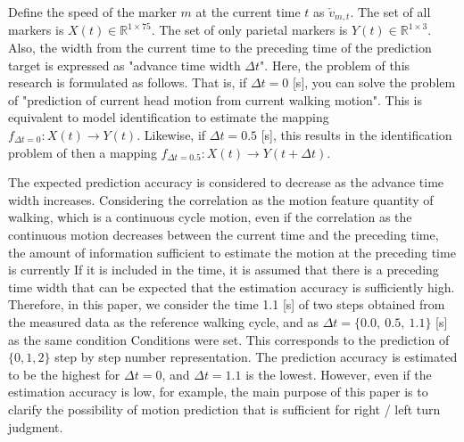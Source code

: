 \documentclass{sigchi}
\begin{document}
Define the speed of the marker $m$ at the current time $t$ as $\check{v}_{m, t}$. The set of all markers is $X(t)\in\mathbb{R}^{1 \times 75} $. The set of only parietal markers is $ Y(t)\in\mathbb {R}^{1\times 3}$. Also, the width from the current time to the preceding time of the prediction target is expressed as "advance time width $\Delta t$". Here, the problem of this research is formulated as follows. That is, if $\Delta t = 0$ [s], you can solve the problem of "prediction of current head motion from current walking motion". This is equivalent to model identification to estimate the mapping $ f_ {\Delta t = 0}: X (t) \rightarrow Y (t) $. Likewise, if $ \Delta t = 0.5 $ [s], this results in the identification problem of then a mapping $ f_ {\Delta t = 0.5}: X (t) \rightarrow Y (t + \Delta t) $.

The expected prediction accuracy is considered to decrease as the advance time width increases. Considering the correlation as the motion feature quantity of walking, which is a continuous cycle motion, even if the correlation as the continuous motion decreases between the current time and the preceding time, the amount of information sufficient to estimate the motion at the preceding time is currently If it is included in the time, it is assumed that there is a preceding time width that can be expected that the estimation accuracy is sufficiently high. Therefore, in this paper, we consider the time 1.1 [s] of two steps obtained from the measured data as the reference walking cycle, and as $ \Delta t = \{0.0, \ 0.5, \ 1.1 \} $ [s] as the same condition Conditions were set. This corresponds to the prediction of $ \{0, 1, 2\} $ step by step number representation. The prediction accuracy is estimated to be the highest for $ \Delta t = 0 $, and $ \Delta t = 1.1 $ is the lowest. However, even if the estimation accuracy is low, for example, the main purpose of this paper is to clarify the possibility of motion prediction that is sufficient for right / left turn judgment.
\end{document}
